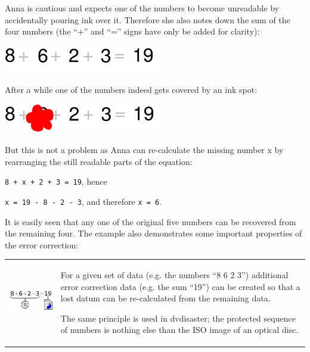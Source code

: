 Anna is cautious and expects one of the numbers to become
unreadable by accidentally pouring ink over it.
Therefore she also notes down the sum of the four
numbers (the ``+'' and ``='' signs have only be added
for clarity):

\bigskip

\includegraphics[height=12mm]{figures/pin-sum.pdf}

After a while one of the numbers indeed gets covered by an ink spot:

\bigskip

\includegraphics[height=13mm]{figures/pin-ink.pdf}

But this is not a problem as Anna can re-calculate the missing number x by rearranging the still readable parts of the equation:

\medskip

\verb|8 + x + 2 + 3 = 19|, \quad hence

\smallskip

\verb|x = 19 - 8 - 2 - 3|, \quad and therefore \verb|x = 6|.

\bigskip

It is easily seen that any one of the original five numbers
can be recovered from the remaining four.
The example also demonstrates some important properties
of the error correction: 

\bigskip

\begin{tabular}{cl}
\begin{minipage}{0.40\textwidth}
  \includegraphics[height=28mm]{icons/ecc-example.png}
\end{minipage}
  &
\begin{minipage}{0.56\textwidth}
  For a given set of data (e.g. the numbers ``8 6 2 3'') additional
  error correction data (e.g. the sum ``19'') can be created so
  that a lost datum can be re-calculated from the remaining data.

  \smallskip
  
  The same principle is used in dvdisaster; the protected sequence
  of numbers is nothing else than the ISO image of an optical disc.
\end{minipage}
\end{tabular}

